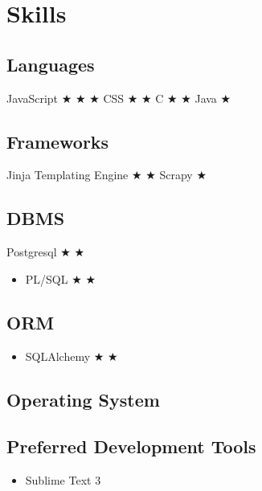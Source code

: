 \documentclass{ss_resume}
\begin{document}
\section{Skills}

\subsection{Languages}
 {JavaScript  $\bigstar$   $\bigstar$   $\bigstar$ }
 {CSS  $\bigstar$  $\bigstar$ }
 {C  $\bigstar$ $\bigstar$ }
 {Java  $\bigstar$ }

\subsection{Frameworks}
 {Jinja Templating Engine  $\bigstar$  $\bigstar$ }
 {Scrapy  $\bigstar$ }

\subsection{DBMS}
 {Postgresql  $\bigstar$  $\bigstar$  }
\begin{itemize}
    \item {PL/SQL $\bigstar$  $\bigstar$  }
\end{itemize}

\subsection{ORM}
\begin{itemize}
    \item {SQLAlchemy $\bigstar$  $\bigstar$  }
\end{itemize}

\subsection{Operating System}

\subsection{Preferred Development Tools}
\begin{itemize}
    \item Sublime Text 3
\end{itemize}

\medskip
\end{document}
